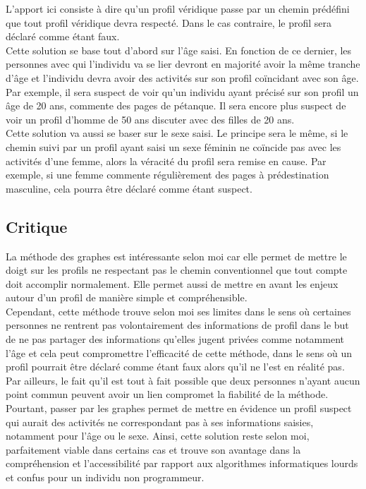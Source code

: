 \documentclass[12pt]{report}
\begin{document}
L'apport ici consiste à dire qu'un profil véridique passe par un chemin prédéfini que tout profil véridique devra respecté. Dans le cas contraire, le profil sera déclaré comme étant faux.\\ Cette solution se base tout d'abord sur l'âge saisi. En fonction de ce dernier, les personnes avec qui l'individu va se lier devront en majorité avoir la même tranche d'âge et l'individu devra avoir des activités sur son profil coïncidant avec son âge. Par exemple, il sera suspect de voir qu'un individu ayant précisé sur son profil un âge de 20 ans, commente des pages de pétanque. Il sera encore plus suspect de voir un profil d'homme de 50 ans discuter avec des filles de 20 ans. \\
Cette solution va aussi se baser sur le sexe saisi. Le principe sera le même, si le chemin suivi par un profil ayant saisi un sexe féminin ne coïncide pas avec les activités d'une femme, alors la véracité du profil sera remise en cause. Par exemple, si une femme commente régulièrement des pages à prédestination masculine, cela pourra être déclaré comme étant suspect. 

\subsection{Critique}
La méthode des graphes est intéressante selon moi car elle permet de mettre le doigt sur les profils ne respectant pas le chemin conventionnel que tout compte doit accomplir normalement. Elle permet aussi de mettre en avant les enjeux autour d'un profil de manière simple et compréhensible. \\

Cependant, cette méthode trouve selon moi ses limites dans le sens où certaines personnes ne rentrent pas volontairement des informations de profil dans le but de ne pas partager des informations qu'elles jugent privées comme notamment l'âge et cela peut compromettre l'efficacité de cette méthode, dans le sens où un profil pourrait être déclaré comme étant faux alors qu'il ne l'est en réalité pas. Par ailleurs, le fait qu'il est tout à fait possible que deux personnes n'ayant aucun point commun peuvent avoir un lien compromet la fiabilité de la méthode. \\

Pourtant, passer par les graphes permet de mettre en évidence un profil suspect qui aurait des activités ne correspondant pas à ses informations saisies, notamment pour l'âge ou le sexe. Ainsi, cette solution reste selon moi, parfaitement viable dans certains cas et trouve son avantage dans la compréhension et l'accessibilité par rapport aux algorithmes informatiques lourds et confus pour un individu non programmeur.
\end{document}
